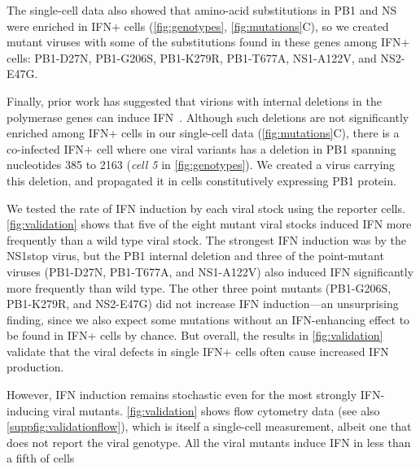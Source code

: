 \documentclass[10pt,letterpaper]{article}
\newcommand{\FIG}[1]{\autoref{fig:#1}}
\newcommand{\SUPPFIG}[1]{\autoref{suppfig:#1}}
\begin{document}
The single-cell data also showed that amino-acid substitutions in PB1 and NS were enriched in IFN+ cells (\FIG{genotypes}, \FIG{mutations}C), so we created mutant viruses with some of the substitutions found in these genes among IFN+ cells: PB1-D27N, PB1-G206S, PB1-K279R, PB1-T677A, NS1-A122V, and NS2-E47G.

Finally, prior work has suggested that virions with internal deletions in the polymerase genes can induce IFN~\citep{baum2010preference, tapia2013defective, boergeling2015evidence, dimmock2015cloned}.
Although such deletions are not significantly enriched among IFN+ cells in our single-cell data (\FIG{mutations}C), there is a co-infected IFN+ cell where one viral variants has a deletion in PB1 spanning nucleotides 385 to 2163 (\textit{cell 5} in \FIG{genotypes}).
We created a virus carrying this deletion, and propagated it in cells constitutively expressing PB1 protein.

We tested the rate of IFN induction by each viral stock using the reporter cells.
\FIG{validation} shows that five of the eight mutant viral stocks induced IFN more frequently than a wild type viral stock.
The strongest IFN induction was by the NS1stop virus, but the PB1 internal deletion and three of the point-mutant viruses (PB1-D27N, PB1-T677A, and NS1-A122V) also induced IFN significantly more frequently than wild type.
The other three point mutants (PB1-G206S, PB1-K279R, and NS2-E47G) did not increase IFN induction---an unsurprising finding, since we also expect some mutations without an IFN-enhancing effect to be found in IFN+ cells by chance.
But overall, the results in \FIG{validation} validate that the viral defects in single IFN+ cells often cause increased IFN production.

However, IFN induction remains stochastic even for the most strongly IFN-inducing viral mutants.
\FIG{validation} shows flow cytometry data (see also \SUPPFIG{validationflow}), which is itself a single-cell measurement, albeit one that does not report the viral genotype.
All the viral mutants induce IFN in less than a fifth of cells 
\end{document}
